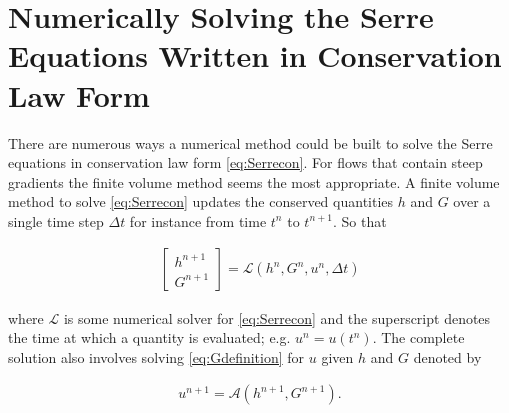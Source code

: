 \documentclass[SingleSpace,12pt,Proceedings]{Serre_ASCE}
\begin{document}
\section{Numerically Solving the Serre Equations Written in Conservation Law Form}
\label{section:Solving the Serre Equations Written in Conservation Law Form}
There are numerous ways a numerical method could be built to solve the Serre equations in conservation law form \eqref{eq:Serrecon}. For flows that contain steep gradients the finite volume method seems the most appropriate. A finite volume method to solve \eqref{eq:Serrecon} updates the conserved quantities $h$ and $G$ over a single time step $\Delta t$ for instance from time $t^n$ to $t^{n+1}$. So that
\begin{linenomath*}
\begin{gather}
\left[\begin{array}{c}
 h^{n+1} \\
 G^{n+1} \end{array}\right] = \mathcal{L}(h^{n},G^{n},u^n,\Delta t)
\label{eq:L}
\end{gather}
\end{linenomath*}
where $\mathcal{L}$ is some numerical solver for \eqref{eq:Serrecon} and the superscript denotes the time at which a quantity is evaluated; e.g. $u^n = u(t^n)$. The complete solution also involves solving \eqref{eq:Gdefinition} for $u$ given $h$ and $G$ denoted by 
\begin{linenomath*}
\begin{gather}
u^{n+1} = \mathcal{A}(h^{n+1},G^{n+1}) .
\label{eq:A}
\end{gather}
\end{linenomath*}
\end{document}
